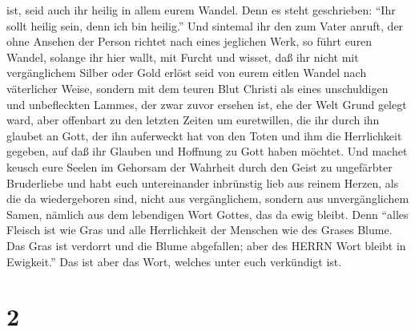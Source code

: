 ist, seid auch ihr heilig in allem eurem Wandel.  Denn es
steht geschrieben: ``Ihr sollt heilig sein, denn ich bin heilig.''
 Und sintemal ihr den zum Vater anruft, der ohne Ansehen
der Person richtet nach eines jeglichen Werk, so führt euren Wandel,
solange ihr hier wallt, mit Furcht  und wisset, daß ihr
nicht mit vergänglichem Silber oder Gold erlöst seid von eurem eitlen
Wandel nach väterlicher Weise,  sondern mit dem teuren Blut
Christi als eines unschuldigen und unbefleckten Lammes, 
der zwar zuvor ersehen ist, ehe der Welt Grund gelegt ward, aber
offenbart zu den letzten Zeiten um euretwillen,  die ihr
durch ihn glaubet an Gott, der ihn auferweckt hat von den Toten und ihm
die Herrlichkeit gegeben, auf daß ihr Glauben und Hoffnung zu Gott haben
möchtet.  Und machet keusch eure Seelen im Gehorsam der
Wahrheit durch den Geist zu ungefärbter Bruderliebe und habt euch
untereinander inbrünstig lieb aus reinem Herzen,  als die
da wiedergeboren sind, nicht aus vergänglichem, sondern aus
unvergänglichem Samen, nämlich aus dem lebendigen Wort Gottes, das da
ewig bleibt.  Denn ``alles Fleisch ist wie Gras und alle
Herrlichkeit der Menschen wie des Grases Blume. Das Gras ist verdorrt
und die Blume abgefallen;  aber des HERRN Wort bleibt in
Ewigkeit.'' Das ist aber das Wort, welches unter euch verkündigt ist.

\hypertarget{section-1}{%
\section{2}\label{section-1}}

